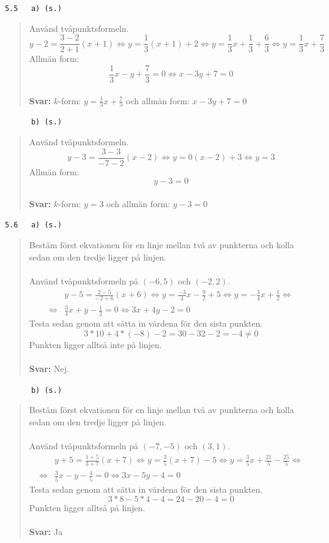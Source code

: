 \documentclass[a4paper]{article}
\newcommand{\tskcol}[1]{\textcolor{tskcol}{#1}}
\begin{document}
	\texttt{\tskcol{5.5~~~a) (s.)}}
	\begin{quotation}
		\noindent
		Använd tvåpunktsformeln.
		\[y-2=\frac{3-2}{2+1}(x+1) \Leftrightarrow
		y=\frac{1}{3}(x+1)+2 \Leftrightarrow
		y=\frac{1}{3}x+\frac{1}{3}+\frac{6}{3} \Leftrightarrow
		y=\frac{1}{3}x+\frac{7}{3}\]
		Allmän form:
		\[\frac{1}{3}x-y+\frac{7}{3}=0 \Leftrightarrow
		x-3y+7=0\]
		\\
		\textbf{Svar:} $k$-form: $y=\frac{1}{3}x+\frac{7}{3}$ och allmän form: $x-3y+7=0$
	\end{quotation}
	
	\texttt{\tskcol{~~~~~~b) (s.)}}
	\begin{quotation}
		\noindent
		Använd tvåpunktsformeln.
		\[y-3=\frac{3-3}{-7-2}(x-2) \Leftrightarrow
		y=0(x-2)+3 \Leftrightarrow
		y=3\]
		Allmän form:
		\[y-3=0\]
		\\
		\textbf{Svar:} $k$-form: $y=3$ och allmän form: $y-3=0$
	\end{quotation}
	
	\texttt{\tskcol{5.6~~~a) (s.)}}
	\begin{quotation}
		\noindent
		Bestäm först ekvationen för en linje mellan två av punkterna och kolla sedan om den tredje ligger på linjen.
		\\ \\
		Använd tvåpunktsformeln på $(-6,5)$ och $(-2,2)$.
		\begin{align*}
		&y-5=\frac{2-5}{-2+6}(x+6) \Leftrightarrow
		y=\frac{-3}{4}x-\frac{9}{2}+5 \Leftrightarrow
		y=-\frac{3}{4}x+\frac{1}{2} \Leftrightarrow \\ \Leftrightarrow
		&\frac{3}{4}x+y-\frac{1}{2}=0 \Leftrightarrow
		3x+4y-2=0
		\end{align*}
		Testa sedan genom att sätta in värdena för den sista punkten.
		\[3*10+4*(-8)-2=30-32-2=-4\neq0\]
		Punkten ligger alltså inte på linjen.
		\\ \\
		\textbf{Svar:} Nej.
	\end{quotation}
	
	\texttt{\tskcol{~~~~~~b) (s.)}}
	\begin{quotation}
		\noindent
		Bestäm först ekvationen för en linje mellan två av punkterna och kolla sedan om den tredje ligger på linjen.
		\\ \\
		Använd tvåpunktsformeln på $(-7,-5)$ och $(3,1)$.
		\begin{align*}
		&y+5=\frac{1+5}{3+7}(x+7) \Leftrightarrow
		y=\frac{3}{5}(x+7)-5 \Leftrightarrow
		y=\frac{3}{5}x+\frac{21}{5}-\frac{25}{5} \Leftrightarrow \\ \Leftrightarrow
		&\frac{3}{5}x-y-\frac{4}{5}=0 \Leftrightarrow
		3x-5y-4=0
		\end{align*}
		Testa sedan genom att sätta in värdena för den sista punkten.
		\[3*8-5*4-4=24-20-4=0\]
		Punkten ligger alltså på linjen.
		\\ \\
		\textbf{Svar:} Ja
	\end{quotation}
	
\end{document}
